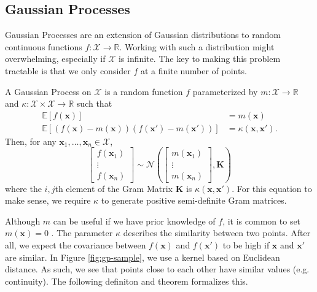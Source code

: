 \subsection{Gaussian Processes}

Gaussian Processes are an extension of Gaussian distributions to random continuous functions $f: \mathcal{X} \to \mathbb{R}$.
Working with such a distribution might overwhelming, especially if $\mathcal{X}$ is infinite.
The key to making this problem tractable is that we only consider $f$ at a finite number of points.


\begin{definition}
    A Gaussian Process on $\mathcal{X}$ is a random function $f$ parameterized by
    $m: \mathcal{X} \to \mathbb{R}$ and $\kappa: \mathcal{X} \times \mathcal{X} \to \mathbb{R}$
    such that
    \begin{align*}
        \mathbb{E}[f(\mathbf{x})] &= m(\mathbf{x}) \\
        \mathbb{E}[(f(\mathbf{x}) - m(\mathbf{x}))(f(\mathbf{x}') - m(\mathbf{x}'))] &= \kappa(\mathbf{x}, \mathbf{x}').
    \end{align*}
    Then, for any $\mathbf{x}_1, \ldots,\mathbf{x}_n \in \mathcal{X}$,
    \begin{equation*}
        \begin{bmatrix}
            f(\mathbf{x}_1) \\ \vdots \\ f(\mathbf{x}_n)
        \end{bmatrix} \sim
        \mathcal{N}\left(
        \begin{bmatrix}
            m(\mathbf{x}_1) \\ \vdots \\ m(\mathbf{x}_n)
        \end{bmatrix}, \mathbf{K}\right)
    \end{equation*}
    where the $i,j$th element of the Gram Matrix $\mathbf{K}$ is $\kappa(\mathbf{x}, \mathbf{x}')$.
    For this equation to make sense, we require $\kappa$ to generate positive semi-definite Gram matrices.
\end{definition}

Although $m$ can be useful if we have prior knowledge of $f$, it is common to set $m(\mathbf{x}) = 0$ \cite{murphy2012}.
The parameter $\kappa$ describes the similarity between two points. After all, we expect the covariance between $f(\mathbf{x})$ and $f(\mathbf{x}')$
to be high if $\mathbf{x}$ and $\mathbf{x}'$ are similar.
In Figure \ref{fig:gp-sample}, we use a kernel based on Euclidean distance.
As such, we see that points close to each other have similar values (e.g. continuity).
The following definiton and theorem formalizes this.


